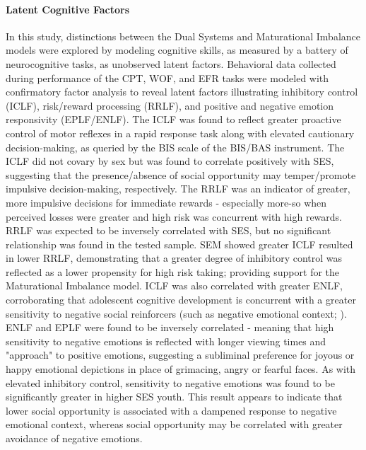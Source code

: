 \documentclass[utf8]{frontiersSCNS} %
\begin{document}
\paragraph*{Latent Cognitive Factors} In this study, distinctions between the Dual Systems and Maturational Imbalance models were explored by modeling cognitive skills, as measured by a battery of neurocognitive tasks, as unobserved latent factors. Behavioral data collected during performance of the CPT, WOF, and EFR tasks were modeled with confirmatory factor analysis to reveal latent factors illustrating inhibitory control (ICLF), risk/reward processing (RRLF), and positive and negative emotion responsivity (EPLF/ENLF). The ICLF was found to reflect greater proactive control of motor reflexes in a rapid response task along with elevated cautionary decision-making, as queried by the BIS scale of the BIS/BAS instrument. The ICLF did not covary by sex but was found to correlate positively with SES, suggesting that the presence/absence of social opportunity may temper/promote impulsive decision-making, respectively. The RRLF was an indicator of greater, more impulsive decisions for immediate rewards - especially more-so when perceived losses were greater and high risk was concurrent with high rewards. RRLF was expected to be inversely correlated with SES, but no significant relationship was found in the tested sample. SEM showed greater ICLF resulted in lower RRLF, demonstrating that a greater degree of inhibitory control was reflected as a lower propensity for high risk taking; providing support for the Maturational Imbalance model. ICLF was also correlated with greater ENLF, corroborating that adolescent cognitive development is concurrent with a greater sensitivity to negative social reinforcers (such as negative emotional context; \cite{jones2014adolescent, rosenbaum2020valence}). ENLF and EPLF were found to be inversely correlated - meaning that high sensitivity to negative emotions is reflected with longer viewing times and "approach" to positive emotions, suggesting a subliminal preference for joyous or happy emotional depictions in place of grimacing, angry or fearful faces. As with elevated inhibitory control, sensitivity to negative emotions was found to be significantly greater in higher SES youth. This result appears to indicate that lower social opportunity is associated with a dampened response to negative emotional context, whereas social opportunity may be correlated with greater avoidance of negative emotions. 
\end{document}
